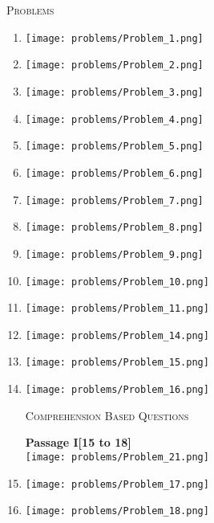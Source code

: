 \documentclass[11pt]{article}
\begin{document}
\begin{center}
    \textsc{Problems}
\end{center}
\begin{enumerate}

   \item \texttt{[image: problems/Problem\_1.png]}
   \item \texttt{[image: problems/Problem\_2.png]}
   \item \texttt{[image: problems/Problem\_3.png]}
   \item \texttt{[image: problems/Problem\_4.png]}
   \item \texttt{[image: problems/Problem\_5.png]}
   \item \texttt{[image: problems/Problem\_6.png]}
   \item \texttt{[image: problems/Problem\_7.png]}
   \item \texttt{[image: problems/Problem\_8.png]}
   \item \texttt{[image: problems/Problem\_9.png]}
   \item \texttt{[image: problems/Problem\_10.png]}
   \item \texttt{[image: problems/Problem\_11.png]}
   \item \texttt{[image: problems/Problem\_14.png]}
   \item \texttt{[image: problems/Problem\_15.png]}
   \item \texttt{[image: problems/Problem\_16.png]}


   \begin{center}
    \textsc{Comprehension Based Questions}
\end{center}
{\textbf{Passage I[15 to 18]}}\\
\texttt{[image: problems/Problem\_21.png]}\\

\item \texttt{[image: problems/Problem\_17.png]}

\item \texttt{[image: problems/Problem\_18.png]}


\end{enumerate}
\end{document}
